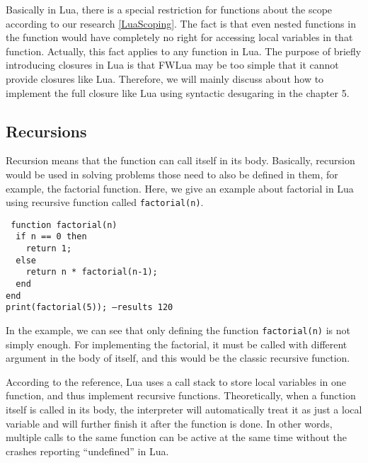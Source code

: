 Basically in Lua, there is a special restriction for functions about the scope according to our research \ref{LuaScoping}. The fact is that even nested functions in the function would have completely no right for accessing local variables in that function. Actually, this fact applies to any function in Lua. The purpose of briefly introducing closures in Lua is that FWLua may be too simple that it cannot provide closures like Lua. Therefore, we will mainly discuss about how to implement the full closure like Lua using syntactic desugaring in the chapter 5. 


\subsection{Recursions}\label{sec:recursions}

Recursion means that the function can call itself in its body. Basically, recursion would be used in solving problems those need to also be defined in them, for example, the factorial function. Here, we give an example about factorial in Lua using recursive function called {\tt factorial(n)}.
\begin{flushleft}
{\tt
function factorial(n)\\
~~if n == 0 then\\
~~~~return 1;\\
~~else\\
~~~~return n * factorial(n-1);\\
~~end\\
end\\

print(factorial(5)); --results 120\\
}
\end{flushleft}

In the example, we can see that only defining the function {\tt factorial(n)} is not simply enough. For implementing the factorial, it must be called with different argument in the body of itself, and this would be the classic recursive function.

According to the reference\cite{begLua}, Lua uses a call stack to store local variables in one function, and thus implement recursive functions. Theoretically, when a function itself is called in its body, the interpreter will automatically treat it as just a local variable and will further finish it after the function is done. In other words, multiple calls to the same function can be active at the same time without the crashes reporting ``undefined'' in Lua.

